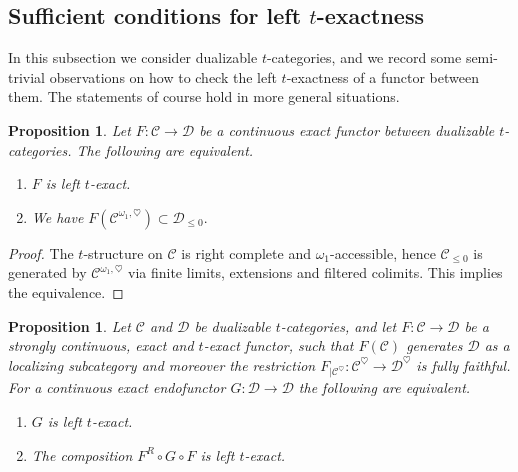 \documentclass[11pt,leqno]{amsart}
\newtheorem{prop}[theo]{Proposition}
\numberwithin{equation}{section}
\newcommand{\cD}{{\mathcal D}}
\newcommand{\cC}{{\mathcal C}}
\begin{document}
\subsection{Sufficient conditions for left $t$-exactness}

In this subsection we consider dualizable $t$-categories, and we record some semi-trivial observations on how to check the left $t$-exactness of a functor between them. The statements of course hold in more general situations.

\begin{prop}\label{prop:left_t_exactness_suffices_for_the_heart}
Let $F:\cC\to\cD$ be a continuous exact functor between dualizable $t$-categories. The following are equivalent.
\begin{enumerate}[label=(\roman*),ref=(\roman*)]
	\item $F$ is left $t$-exact.
	\item We have $F(\cC^{\omega_1,\heartsuit})\subset \cD_{\leq 0}.$
\end{enumerate}
\end{prop}

\begin{proof}
The $t$-structure on $\cC$ is right complete and $\omega_1$-accessible, hence $\cC_{\leq 0}$ is generated by $\cC^{\omega_1,\heartsuit}$ via finite limits, extensions and filtered colimits. This implies the equivalence.
\end{proof}

\begin{prop}\label{prop:left_t_exactness_suffices_for_composition}
Let $\cC$ and $\cD$ be dualizable $t$-categories, and let $F:\cC\to\cD$ be a strongly continuous, exact and $t$-exact functor, such that $F(\cC)$ generates $\cD$ as a localizing subcategory and moreover the restriction $F_{\mid \cC^{\heartsuit}}:\cC^{\heartsuit}\to\cD^{\heartsuit}$ is fully faithful. For a continuous exact endofunctor $G:\cD\to\cD$ the following are equivalent.
\begin{enumerate}[label=(\roman*),ref=(\roman*)]
	\item $G$ is left $t$-exact. \label{G_left_t_exact}
	\item The composition $F^R\circ G\circ F$ is left $t$-exact. \label{composition_left_t_exact}
\end{enumerate}
\end{prop}
\end{document}
